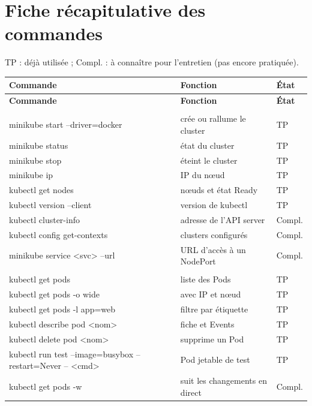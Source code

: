\documentclass[11pt,a4paper]{article}
\renewcommand{\arraystretch}{1.2}
\begin{document}
\section{Fiche récapitulative des commandes}

TP : déjà utilisée ; Compl. : à connaître pour l'entretien (pas encore pratiquée).

\renewcommand{\arraystretch}{1.15}
\begin{longtable}{@{}>{\raggedright\arraybackslash\ttfamily\small}p{8.2cm}>{\raggedright\arraybackslash\small}p{5.6cm}>{\centering\arraybackslash\small}p{1.5cm}@{}}
\toprule
\normalfont\textbf{Commande} & \textbf{Fonction} & \textbf{État} \\
\midrule
\endfirsthead
\toprule
\normalfont\textbf{Commande} & \textbf{Fonction} & \textbf{État} \\
\midrule
\endhead
\bottomrule
\endfoot
\multicolumn{3}{@{}l}{\textbf{Cluster et minikube}} \\
minikube start --driver=docker & crée ou rallume le cluster & TP \\
minikube status & état du cluster & TP \\
minikube stop & éteint le cluster & TP \\
minikube ip & IP du nœud & TP \\
kubectl get nodes & nœuds et état Ready & TP \\
kubectl version --client & version de kubectl & TP \\
kubectl cluster-info & adresse de l'API server & Compl. \\
kubectl config get-contexts & clusters configurés & Compl. \\
minikube service <svc> --url & URL d'accès à un NodePort & Compl. \\
\midrule
\multicolumn{3}{@{}l}{\textbf{Pods}} \\
kubectl get pods & liste des Pods & TP \\
kubectl get pods -o wide & avec IP et nœud & TP \\
kubectl get pods -l app=web & filtre par étiquette & TP \\
kubectl describe pod <nom> & fiche et Events & TP \\
kubectl delete pod <nom> & supprime un Pod & TP \\
kubectl run test --image=busybox --restart=Never -- <cmd> & Pod jetable de test & TP \\
kubectl get pods -w & suit les changements en direct & Compl. \\

\end{longtable}
\end{document}

